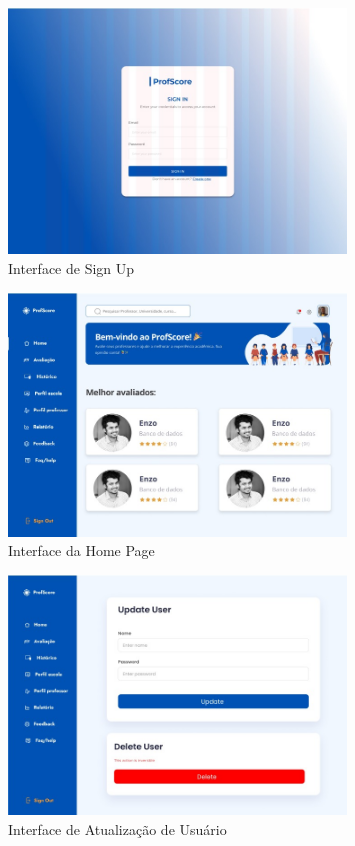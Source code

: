 \documentclass[12pt]{article}
\begin{document}
\begin{figure}[H] %
  \centering
  \includegraphics[width=0.8\textwidth]{interfaces/i2-signin.png}
  \caption{Interface de Sign Up}
  \label{fig:i2-signin}
\end{figure}

\begin{figure}[H] %
  \centering
  \includegraphics[width=0.8\textwidth]{interfaces/i3-home.png}
  \caption{Interface da Home Page}
  \label{fig:i3-home}
\end{figure}

\begin{figure}[H] %
  \centering
  \includegraphics[width=0.8\textwidth]{interfaces/i4-update-user.png}
  \caption{Interface de Atualização de Usuário}
  \label{fig:i4-update-user}
\end{figure}
\end{document}
